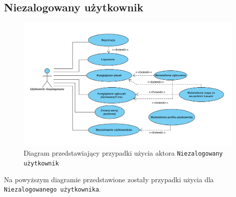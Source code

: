 \subsection{Niezalogowany użytkownik}
\begin{figure}[H]
	\centering
		\includegraphics[width=\linewidth]{rozdzial1/PU_niezalogowany_uzytkownik.jpg}
	\caption{Diagram przedstawiający przypadki użycia aktora \texttt{Niezalogowany użytkownik}}
	\label{Rys. fig:Diagram przedstawiający przypadki użycia aktora Niezalogowany użytkownik}
\end{figure}
Na powyższym diagramie przedstawione zostały przypadki użycia dla \texttt{Niezalogowanego użytkownika}. \\

